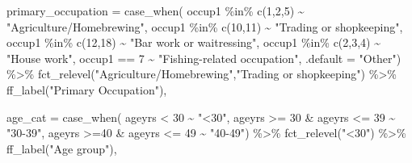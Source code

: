 \documentclass[
  letterpaper,
  DIV=11,
  numbers=noendperiod]{scrartcl}
\newenvironment{Shaded}{\begin{snugshade}}{\end{snugshade}}
\newcommand{\AttributeTok}[1]{\textcolor[rgb]{0.40,0.45,0.13}{#1}}
\newcommand{\DecValTok}[1]{\textcolor[rgb]{0.68,0.00,0.00}{#1}}
\newcommand{\FunctionTok}[1]{\textcolor[rgb]{0.28,0.35,0.67}{#1}}
\newcommand{\NormalTok}[1]{\textcolor[rgb]{0.00,0.23,0.31}{#1}}
\newcommand{\SpecialCharTok}[1]{\textcolor[rgb]{0.37,0.37,0.37}{#1}}
\newcommand{\StringTok}[1]{\textcolor[rgb]{0.13,0.47,0.30}{#1}}
\begin{document}
\begin{Shaded}
\begin{Highlighting}[]
         \AttributeTok{primary\_occupation =} \FunctionTok{case\_when}\NormalTok{(}
\NormalTok{           occup1 }\SpecialCharTok{\%in\%} \FunctionTok{c}\NormalTok{(}\DecValTok{1}\NormalTok{,}\DecValTok{2}\NormalTok{,}\DecValTok{5}\NormalTok{) }\SpecialCharTok{\textasciitilde{}} \StringTok{"Agriculture/Homebrewing"}\NormalTok{,}
\NormalTok{           occup1 }\SpecialCharTok{\%in\%} \FunctionTok{c}\NormalTok{(}\DecValTok{10}\NormalTok{,}\DecValTok{11}\NormalTok{) }\SpecialCharTok{\textasciitilde{}} \StringTok{"Trading or shopkeeping"}\NormalTok{,}
\NormalTok{           occup1 }\SpecialCharTok{\%in\%} \FunctionTok{c}\NormalTok{(}\DecValTok{12}\NormalTok{,}\DecValTok{18}\NormalTok{) }\SpecialCharTok{\textasciitilde{}} \StringTok{"Bar work or waitressing"}\NormalTok{,}
\NormalTok{           occup1 }\SpecialCharTok{\%in\%} \FunctionTok{c}\NormalTok{(}\DecValTok{2}\NormalTok{,}\DecValTok{3}\NormalTok{,}\DecValTok{4}\NormalTok{) }\SpecialCharTok{\textasciitilde{}} \StringTok{"House work"}\NormalTok{,}
\NormalTok{           occup1  }\SpecialCharTok{==} \DecValTok{7} \SpecialCharTok{\textasciitilde{}} \StringTok{"Fishing{-}related occupation"}\NormalTok{,}
           \AttributeTok{.default =} \StringTok{"Other"}\NormalTok{) }\SpecialCharTok{\%\textgreater{}\%} 
           \FunctionTok{fct\_relevel}\NormalTok{(}\StringTok{"Agriculture/Homebrewing"}\NormalTok{,}\StringTok{"Trading or shopkeeping"}\NormalTok{) }\SpecialCharTok{\%\textgreater{}\%} 
           \FunctionTok{ff\_label}\NormalTok{(}\StringTok{"Primary Occupation"}\NormalTok{),}
         
         \AttributeTok{age\_cat =} \FunctionTok{case\_when}\NormalTok{(}
\NormalTok{                             ageyrs }\SpecialCharTok{\textless{}} \DecValTok{30} \SpecialCharTok{\textasciitilde{}} \StringTok{"\textless{}30"}\NormalTok{,}
\NormalTok{                             ageyrs }\SpecialCharTok{\textgreater{}=} \DecValTok{30} \SpecialCharTok{\&}\NormalTok{ ageyrs }\SpecialCharTok{\textless{}=} \DecValTok{39} \SpecialCharTok{\textasciitilde{}}  \StringTok{"30{-}39"}\NormalTok{,}
\NormalTok{                             ageyrs }\SpecialCharTok{\textgreater{}=}\DecValTok{40} \SpecialCharTok{\&}\NormalTok{ ageyrs }\SpecialCharTok{\textless{}=} \DecValTok{49} \SpecialCharTok{\textasciitilde{}} \StringTok{"40{-}49"}\NormalTok{) }\SpecialCharTok{\%\textgreater{}\%} 
           \FunctionTok{fct\_relevel}\NormalTok{(}\StringTok{"\textless{}30"}\NormalTok{) }\SpecialCharTok{\%\textgreater{}\%} 
           \FunctionTok{ff\_label}\NormalTok{(}\StringTok{"Age group"}\NormalTok{),}
         

\end{Highlighting}
\end{Shaded}
\end{document}
